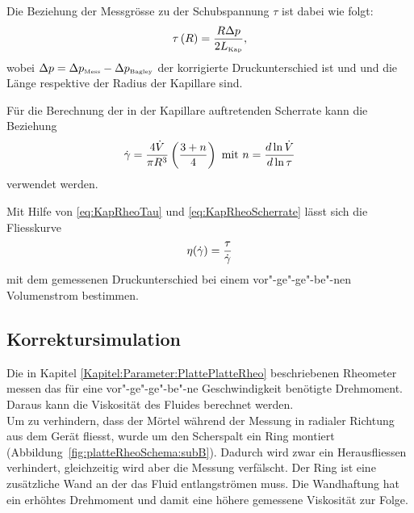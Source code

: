 Die Beziehung der Messgrösse  zu der Schubspannung $\tau$ ist dabei wie folgt:
\begin{equation}
    \label{eq:KapRheoTau}
    \tau\left( R \right) = \frac{R \Delta p}{2L_\text{\tiny Kap}},
\end{equation}
wobei $\Delta p = \Delta p_{\mbox{\tiny Mess}} -\Delta p_{\mbox{\tiny Bagley}}$ der korrigierte Druckunterschied ist und  und  die Länge respektive der Radius der Kapillare sind.

Für die Berechnung der in der Kapillare auftretenden Scherrate kann die Beziehung
\begin{equation}
    \label{eq:KapRheoScherrate}
    \dot\gamma = \frac{4 \dot{V}}{\pi R^3}\left( \frac{3+n}{4} \right) \mbox{ mit } n=\frac{d \ln \dot{V}}{d\ln\tau}
\end{equation}
verwendet werden. 

Mit Hilfe von \eqref{eq:KapRheoTau} und \eqref{eq:KapRheoScherrate} lässt sich die Fliesskurve 
\begin{equation}
    \eta(\dot\gamma) = \frac{\tau}{\dot\gamma}
\end{equation}
mit dem gemessenen Druckunterschied bei einem vor"-ge"-ge"-be"-nen Volumenstrom bestimmen.
%
%
\subsection{Korrektursimulation}
\label{Kapitel:Korrektursimulation}
Die in Kapitel \ref{Kapitel:Parameter:PlattePlatteRheo} beschriebenen Rheometer messen das für eine vor"-ge"-ge"-be"-ne Geschwindigkeit benötigte Drehmoment. Daraus kann die Viskosität des Fluides berechnet werden.\\
Um zu verhindern, dass der Mörtel während der Messung in radialer Richtung aus dem Gerät fliesst, wurde um den Scherspalt ein Ring montiert (Abbildung~\ref{fig:platteRheoSchema:subB}). Dadurch wird zwar ein Herausfliessen verhindert, gleichzeitig wird aber die Messung verfälscht. Der Ring ist eine zusätzliche Wand an der das Fluid entlangströmen muss. Die Wandhaftung hat ein erhöhtes Drehmoment und damit eine höhere gemessene Viskosität zur Folge.

